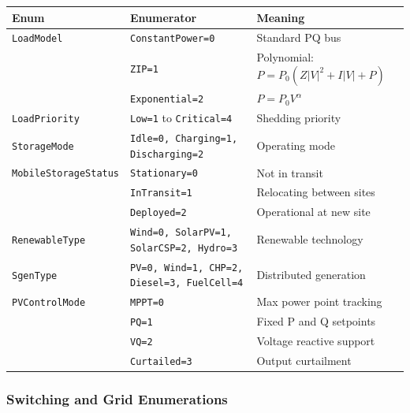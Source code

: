 \begin{center}
\begin{tabular}{lll}
\hline\hline
\textbf{Enum} & \textbf{Enumerator} & \textbf{Meaning} \\
\hline
\texttt{LoadModel} & \texttt{ConstantPower=0} & Standard PQ bus \\
 & \texttt{ZIP=1} & Polynomial: \(P=P_0(Z|V|^2+I|V|+P)\) \\
 & \texttt{Exponential=2} & \(P=P_0 V^\alpha\) \\
\hline
\texttt{LoadPriority} & \texttt{Low=1} to \texttt{Critical=4} & Shedding priority \\
\hline
\texttt{StorageMode} & \texttt{Idle=0, Charging=1, Discharging=2} & Operating mode \\
\hline
\texttt{MobileStorageStatus} & \texttt{Stationary=0} & Not in transit \\
 & \texttt{InTransit=1} & Relocating between sites \\
 & \texttt{Deployed=2} & Operational at new site \\
\hline
\texttt{RenewableType} & \texttt{Wind=0, SolarPV=1, SolarCSP=2, Hydro=3} & Renewable technology \\
\hline
\texttt{SgenType} & \texttt{PV=0, Wind=1, CHP=2, Diesel=3, FuelCell=4} & Distributed generation \\
\hline
\texttt{PVControlMode} & \texttt{MPPT=0} & Max power point tracking \\
 & \texttt{PQ=1} & Fixed P and Q setpoints \\
 & \texttt{VQ=2} & Voltage reactive support \\
 & \texttt{Curtailed=3} & Output curtailment \\
\hline\hline
\end{tabular}
\end{center}

\subsubsection{Switching and Grid Enumerations}

